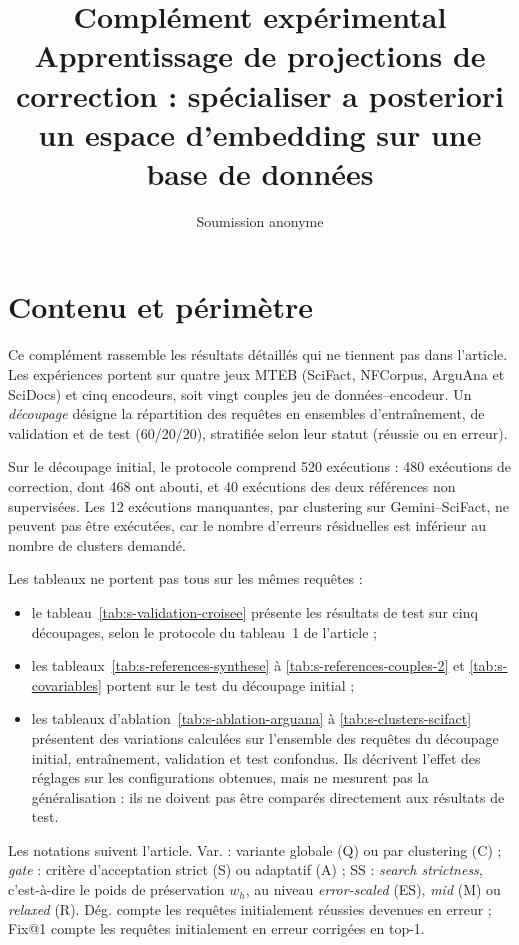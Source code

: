 \documentclass[a4paper,10pt]{article}
\title{Complément expérimental\\[0.4em]\large Apprentissage de projections de correction : spécialiser a posteriori un espace d'embedding sur une base de données}
\author{Soumission anonyme}
\date{}
\begin{document}
\maketitle

\section{Contenu et périmètre}

Ce complément rassemble les résultats détaillés qui ne tiennent pas dans l'article. Les expériences portent sur quatre jeux MTEB (SciFact, NFCorpus, ArguAna et SciDocs) et cinq encodeurs, soit vingt couples jeu de données--encodeur. Un \emph{découpage} désigne la répartition des requêtes en ensembles d'entraînement, de validation et de test (60/20/20), stratifiée selon leur statut (réussie ou en erreur).

Sur le découpage initial, le protocole comprend 520 exécutions : 480 exécutions de correction, dont 468 ont abouti, et 40 exécutions des deux références non supervisées. Les 12 exécutions manquantes, par clustering sur Gemini--SciFact, ne peuvent pas être exécutées, car le nombre d'erreurs résiduelles est inférieur au nombre de clusters demandé.

Les tableaux ne portent pas tous sur les mêmes requêtes :
\begin{itemize}
  \item le tableau~\ref{tab:s-validation-croisee} présente les résultats de test sur cinq découpages, selon le protocole du tableau~1 de l'article ;
  \item les tableaux~\ref{tab:s-references-synthese} à \ref{tab:s-references-couples-2} et \ref{tab:s-covariables} portent sur le test du découpage initial ;
  \item les tableaux d'ablation~\ref{tab:s-ablation-arguana} à \ref{tab:s-clusters-scifact} présentent des variations calculées sur l'ensemble des requêtes du découpage initial, entraînement, validation et test confondus. Ils décrivent l'effet des réglages sur les configurations obtenues, mais ne mesurent pas la généralisation : ils ne doivent pas être comparés directement aux résultats de test.
\end{itemize}

Les notations suivent l'article. Var. : variante globale (Q) ou par clustering (C) ; \textit{gate} : critère d'acceptation strict (S) ou adaptatif (A) ; SS : \textit{search strictness}, c'est-à-dire le poids de préservation $w_h$, au niveau \textit{error-scaled} (ES), \textit{mid} (M) ou \textit{relaxed} (R). Dég. compte les requêtes initialement réussies devenues en erreur ; Fix@1 compte les requêtes initialement en erreur corrigées en top-1.
\end{document}
